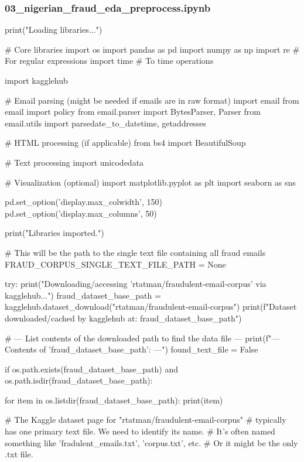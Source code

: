 \subsubsection*{03\_nigerian\_fraud\_eda\_preprocess.ipynb}

\begin{ffcode}
print("Loading libraries...")

# Core libraries
import os
import pandas as pd
import numpy as np
import re # For regular expressions
import time # To time operations

import kagglehub

# Email parsing (might be needed if emails are in raw format)
import email
from email import policy
from email.parser import BytesParser, Parser
from email.utils import parsedate_to_datetime, getaddresses

# HTML processing (if applicable)
from bs4 import BeautifulSoup

# Text processing
import unicodedata

# Visualization (optional)
import matplotlib.pyplot as plt
import seaborn as sns

pd.set_option('display.max_colwidth', 150)
pd.set_option('display.max_columns', 50)

print("Libraries imported.\n")

# This will be the path to the single text file containing all fraud emails
FRAUD_CORPUS_SINGLE_TEXT_FILE_PATH = None

try:
    print("Downloading/accessing 'rtatman/fraudulent-email-corpus' via kagglehub...")
    fraud_dataset_base_path = kagglehub.dataset_download("rtatman/fraudulent-email-corpus")
    print(f"Dataset downloaded/cached by kagglehub at: {fraud_dataset_base_path}")

    # --- List contents of the downloaded path to find the data file ---
    print(f"\n--- Contents of '{fraud_dataset_base_path}': ---")
    found_text_file = False

    if os.path.exists(fraud_dataset_base_path) and os.path.isdir(fraud_dataset_base_path):

        for item in os.listdir(fraud_dataset_base_path):
            print(item)

            # The Kaggle dataset page for "rtatman/fraudulent-email-corpus"
            # typically has one primary text file. We need to identify its name.
            # It's often named something like 'fradulent_emails.txt', 'corpus.txt', etc.
            # Or it might be the only .txt file.


\end{ffcode}
